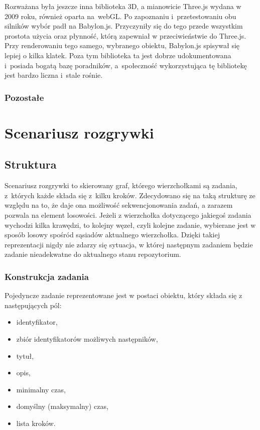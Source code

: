 \documentclass[11pt,a4paper,polish,thesis]{dcsbook}
\begin{document}
	Rozważana była jeszcze inna biblioteka 3D, a mianowicie Three.js wydana w 2009 roku, również oparta na~webGL. Po zapoznaniu i~przetestowaniu obu silników wybór padł na Babylon.js. Przyczyniły się do tego przede wszystkim prostota użycia oraz płynność, którą zapewniał w przeciwieństwie do Three.js. Przy renderowaniu tego samego, wybranego obiektu, Babylon.js spisywał się lepiej o kilka klatek. Poza tym biblioteka ta jest dobrze udokumentowana i~posiada bogatą bazę poradników, a~społeczność wykorzystująca tę bibliotekę jest bardzo liczna i~stale rośnie.
	
	\subsubsection{Pozostałe}
	
	\section{Scenariusz rozgrywki}
	
	\subsection{Struktura} \label{Struktura}
	
	Scenariusz rozgrywki to skierowany graf, którego wierzchołkami są zadania, z~których każde składa się z~kilku kroków. Zdecydowano się na taką strukturę ze względu na to, że daje ona możliwość sekwencjonowania zadań, a zarazem pozwala na element losowości. Jeżeli z wierzchołka dotyczącego jakiegoś zadania wychodzi kilka krawędzi, to kolejny węzeł, czyli kolejne zadanie, wybierane jest w sposób losowy spośród sąsiadów aktualnego wierzchołka. Dzięki takiej reprezentacji nigdy nie zdarzy się sytuacja, w której następnym zadaniem będzie zadanie nieadekwatne do aktualnego stanu repozytorium.

	\subsubsection{Konstrukcja zadania}
	Pojedyncze zadanie reprezentowane jest w postaci obiektu, który składa się z następujących pól:
	\begin{itemize}
	\item identyfikator,
	\item zbiór identyfikatorów możliwych następników,
	\item tytuł,
	\item opis,
	\item minimalny czas,
	\item domyślny (maksymalny) czas,
	\item lista kroków.	
	\end{itemize}
	
\end{document}
